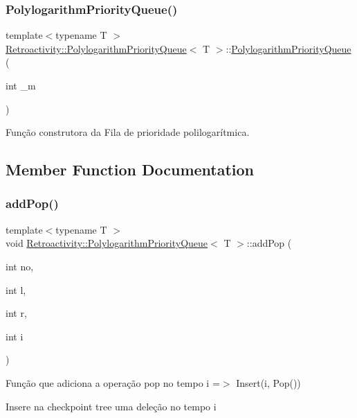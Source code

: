 \subsubsection{\texorpdfstring{Polylogarithm\+Priority\+Queue()}{PolylogarithmPriorityQueue()}}
{\footnotesize\ttfamily template$<$typename T $>$ \\
\hyperlink{classRetroactivity_1_1PolylogarithmPriorityQueue}{Retroactivity\+::\+Polylogarithm\+Priority\+Queue}$<$ T $>$\+::\hyperlink{classRetroactivity_1_1PolylogarithmPriorityQueue}{Polylogarithm\+Priority\+Queue} (\begin{DoxyParamCaption}\item[{int}]{\+\_\+m }\end{DoxyParamCaption})}

Função construtora da Fila de prioridade polilogarítmica. 

\subsection{Member Function Documentation}
\mbox{\label{classRetroactivity_1_1PolylogarithmPriorityQueue_afc4926b8969ceb49e18eec4bcfedc054}} 
\subsubsection{\texorpdfstring{add\+Pop()}{addPop()}}
{\footnotesize\ttfamily template$<$typename T $>$ \\
void \hyperlink{classRetroactivity_1_1PolylogarithmPriorityQueue}{Retroactivity\+::\+Polylogarithm\+Priority\+Queue}$<$ T $>$\+::add\+Pop (\begin{DoxyParamCaption}\item[{int}]{no,  }\item[{int}]{l,  }\item[{int}]{r,  }\item[{int}]{i }\end{DoxyParamCaption})}

Função que adiciona a operação pop no tempo i =$>$ Insert(i, Pop())

Insere na checkpoint tree uma deleção no tempo i


